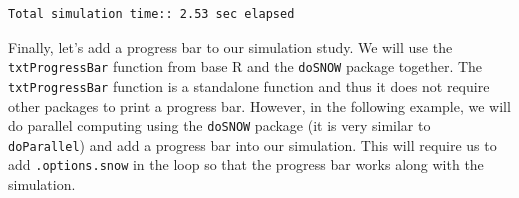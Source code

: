 \documentclass[
]{book}
\newenvironment{Shaded}{\begin{snugshade}}{\end{snugshade}}
\newcommand{\CommentTok}[1]{\textcolor[rgb]{0.56,0.35,0.01}{\textit{#1}}}
\newcommand{\ControlFlowTok}[1]{\textcolor[rgb]{0.13,0.29,0.53}{\textbf{#1}}}
\newcommand{\DataTypeTok}[1]{\textcolor[rgb]{0.13,0.29,0.53}{#1}}
\newcommand{\DecValTok}[1]{\textcolor[rgb]{0.00,0.00,0.81}{#1}}
\newcommand{\KeywordTok}[1]{\textcolor[rgb]{0.13,0.29,0.53}{\textbf{#1}}}
\newcommand{\NormalTok}[1]{#1}
\newcommand{\StringTok}[1]{\textcolor[rgb]{0.31,0.60,0.02}{#1}}
\begin{document}
\begin{verbatim}
Total simulation time:: 2.53 sec elapsed
\end{verbatim}

Finally, let's add a progress bar to our simulation study. We will use the \texttt{txtProgressBar} function from base R and the \texttt{doSNOW} package \citep{R-doSNOW} together. The \texttt{txtProgressBar} function is a standalone function and thus it does not require other packages to print a progress bar. However, in the following example, we will do parallel computing using the \texttt{doSNOW} package (it is very similar to \texttt{doParallel}) and add a progress bar into our simulation. This will require us to add \texttt{.options.snow} in the loop so that the progress bar works along with the simulation.

\begin{Shaded}
\end{Shaded}
\end{document}
